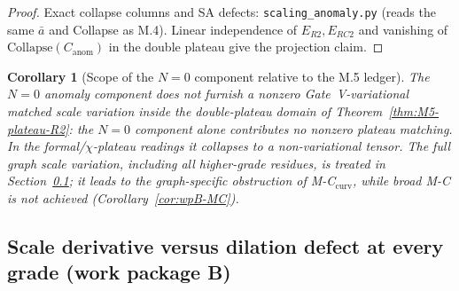 \documentclass{article}
\newtheorem{corollary}[proposition]{Corollary}
\theoremstyle{remark}
\newcommand{\Coll}{\mathrm{Collapse}}
\begin{document}
\begin{proof}
Exact collapse columns and SA defects: \texttt{scaling\_anomaly.py} (reads the same $\bar a$ and Collapse as M.4).
Linear independence of $E_{R2},E_{RC2}$ and vanishing of $\Coll(C_{\mathrm{anom}})$ in the double plateau give the projection claim.
\end{proof}

\begin{corollary}[Scope of the $N=0$ component relative to the M.5 ledger]
\label{cor:M6-compat}
The $N=0$ anomaly component does \emph{not} furnish a nonzero Gate~V-variational matched scale variation inside the double-plateau domain of Theorem~\ref{thm:M5-plateau-R2}: the $N=0$ component alone contributes no nonzero plateau matching.
In the formal/$\chi$-plateau readings it collapses to a non-variational tensor.
The full graph scale variation, including all higher-grade residues, is treated in Section~\ref{sec:wpB}; it leads to the graph-specific obstruction of M-C$_{\mathrm{curv}}$, while broad M-C is not achieved (Corollary~\ref{cor:wpB-MC}).
\end{corollary}

\subsection{Scale derivative versus dilation defect at every grade (work package B)}
\label{sec:wpB}
\end{document}
